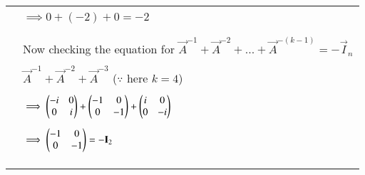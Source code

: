 \begin{longtable}{|l|l|}
        & \\
        & \qquad \qquad $\implies 0+(-2)+0 = -2$\\
        & \\
		& \\
		& Now checking the equation for $\vec{A}^{-1}+\Vec{A}^{-2}+...+\vec{A}^{-(k-1)} = -\vec{I}_n$ \\
        & \\
        & \qquad \qquad \qquad $\vec{A}^{-1}+\Vec{A}^{-2}+\vec{A}^{-3}$ \qquad ($\because$ here $k=4$) \\
        & \\
        & \qquad \qquad $\implies \begin{pmatrix}-i&0 \\ 0&i\end{pmatrix} + \begin{pmatrix}-1&0 \\ 0&-1\end{pmatrix} + \begin{pmatrix}i&0 \\ 0&-i\end{pmatrix}$ \\
        & \\
        & \qquad \qquad $\implies \begin{pmatrix}-1&0 \\ 0&-1\end{pmatrix} = -\mathbf{I}_2$  \\
        & \\
		& \\
		\hline
\caption{}
\label{eq:solutions/2015/june/70/tab2}
	\end{longtable}
		
\twocolumn
